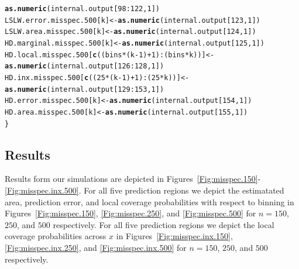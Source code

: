 \documentclass[11pt]{article}\usepackage[]{graphicx}\usepackage[]{color}
\makeatletter
\newcommand{\hlnum}[1]{\textcolor[rgb]{0.686,0.059,0.569}{#1}}%
\newcommand{\hlopt}[1]{\textcolor[rgb]{0,0,0}{#1}}%
\newcommand{\hlstd}[1]{\textcolor[rgb]{0.345,0.345,0.345}{#1}}%
\newcommand{\hlkwb}[1]{\textcolor[rgb]{0.69,0.353,0.396}{#1}}%
\newcommand{\hlkwd}[1]{\textcolor[rgb]{0.737,0.353,0.396}{\textbf{#1}}}%
\newenvironment{kframe}{%
 \def\at@end@of@kframe{}%
 \ifinner\ifhmode%
  \def\at@end@of@kframe{\end{minipage}}%
  \begin{minipage}{\columnwidth}%
 \fi\fi%
 \def\FrameCommand##1{\hskip\@totalleftmargin \hskip-\fboxsep
 \colorbox{shadecolor}{##1}\hskip-\fboxsep
     \hskip-\linewidth \hskip-\@totalleftmargin \hskip\columnwidth}%
 \MakeFramed {\advance\hsize-\width
   \@totalleftmargin\z@ \linewidth\hsize
   \@setminipage}}%
 {\par\unskip\endMakeFramed%
 \at@end@of@kframe}
\newenvironment{knitrout}{}{} %
\makeatother
\begin{document}
\begin{knitrout}
\begin{kframe}
\begin{alltt}
    \hlkwd{as.numeric}\hlstd{(internal.output[}\hlnum{98}\hlopt{:}\hlnum{122}\hlstd{,} \hlnum{1}\hlstd{])}
  \hlstd{LSLW.error.misspec.500[k]} \hlkwb{<-} \hlkwd{as.numeric}\hlstd{(internal.output[}\hlnum{123}\hlstd{,} \hlnum{1}\hlstd{])}
  \hlstd{LSLW.area.misspec.500[k]} \hlkwb{<-} \hlkwd{as.numeric}\hlstd{(internal.output[}\hlnum{124}\hlstd{,} \hlnum{1}\hlstd{])}
  \hlstd{HD.marginal.misspec.500[k]} \hlkwb{<-} \hlkwd{as.numeric}\hlstd{(internal.output[}\hlnum{125}\hlstd{,} \hlnum{1}\hlstd{])}
  \hlstd{HD.local.misspec.500[}\hlkwd{c}\hlstd{((bins}\hlopt{*}\hlstd{(k}\hlopt{-}\hlnum{1}\hlstd{)}\hlopt{+}\hlnum{1}\hlstd{)}\hlopt{:}\hlstd{(bins}\hlopt{*}\hlstd{k))]} \hlkwb{<-}
    \hlkwd{as.numeric}\hlstd{(internal.output[}\hlnum{126}\hlopt{:}\hlnum{128}\hlstd{,} \hlnum{1}\hlstd{])}
  \hlstd{HD.inx.misspec.500[}\hlkwd{c}\hlstd{((}\hlnum{25}\hlopt{*}\hlstd{(k}\hlopt{-}\hlnum{1}\hlstd{)}\hlopt{+}\hlnum{1}\hlstd{)}\hlopt{:}\hlstd{(}\hlnum{25}\hlopt{*}\hlstd{k))]} \hlkwb{<-}
    \hlkwd{as.numeric}\hlstd{(internal.output[}\hlnum{129}\hlopt{:}\hlnum{153}\hlstd{,} \hlnum{1}\hlstd{])}
  \hlstd{HD.error.misspec.500[k]} \hlkwb{<-} \hlkwd{as.numeric}\hlstd{(internal.output[}\hlnum{154}\hlstd{,} \hlnum{1}\hlstd{])}
  \hlstd{HD.area.misspec.500[k]} \hlkwb{<-} \hlkwd{as.numeric}\hlstd{(internal.output[}\hlnum{155}\hlstd{,} \hlnum{1}\hlstd{])}
\hlstd{\}}
\end{alltt}
\end{kframe}
\end{knitrout}


\newpage
\subsection{Results}
\label{sec:misspec-Results}

Results form our simulations are depicted in 
Figures~\ref{Fig:misspec.150}-\ref{Fig:misspec.inx.500}.  
For all five prediction regions we depict the estimatated area, prediction 
error, and local coverage probabilities with respect to binning in 
Figures~\ref{Fig:misspec.150}, \ref{Fig:misspec.250}, and 
\ref{Fig:misspec.500} for $n = 150$, $250$, and $500$ respectively.  For all 
five prediction regions we depict the local coverage probabilities across $x$ 
in Figures~\ref{Fig:misspec.inx.150}, \ref{Fig:misspec.inx.250}, and 
\ref{Fig:misspec.inx.500} for $n = 150$, $250$, and $500$ respectively.
\end{document}
